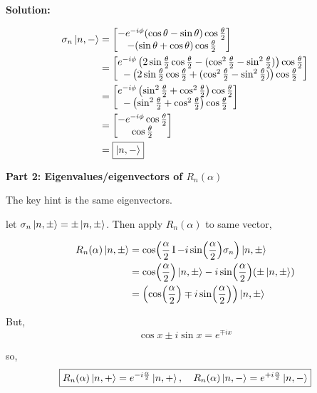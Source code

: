 \documentclass[11pt]{article}
\newenvironment{solution}
{\par\noindent\textbf{Solution:}\par}
{\vspace{1em}}
\begin{document}
\begin{solution}
\[\begin{aligned}
\sigma_n\ket{n,-} &= \begin{bmatrix}-e^{-i\phi}(\cos{\theta} - \sin{\theta})\cos{\frac{\theta}{2}} \\ -(\sin{\theta} + \cos{\theta})\cos{\frac{\theta}{2}}\end{bmatrix} \\
&= \begin{bmatrix}e^{-i\phi}\left(2\sin{\frac{\theta}{2}}\cos{\frac{\theta}{2}} - (\cos^2{\frac{\theta}{2}} - \sin^2{\frac{\theta}{2}})\right)\cos{\frac{\theta}{2}} \\ -\left(2\sin{\frac{\theta}{2}}\cos{\frac{\theta}{2}} + (\cos^2{\frac{\theta}{2}} - \sin^2{\frac{\theta}{2}})\right)\cos{\frac{\theta}{2}}\end{bmatrix} \\
&= \begin{bmatrix}e^{-i\phi}\left(\sin^2{\frac{\theta}{2}} + \cos^2{\frac{\theta}{2}}\right)\cos{\frac{\theta}{2}} \\ -\left(\sin^2{\frac{\theta}{2}} + \cos^2{\frac{\theta}{2}}\right)\cos{\frac{\theta}{2}}\end{bmatrix} \\
&= \begin{bmatrix}-e^{-i\phi}\cos{\frac{\theta}{2}} \\ \cos{\frac{\theta}{2}}\end{bmatrix} \\
&= \boxed{\ket{n,-}}
\end{aligned}\]

\textbf{Part 2: Eigenvalues/eigenvectors of $R_n(\alpha)$}

The key hint is the same eigenvectors.

let $\sigma_n\ket{n,\pm} = \pm\ket{n,\pm}$. Then apply $R_n(\alpha)$ to same vector,

\[\begin{aligned}
R_n(\alpha)\ket{n,\pm} &= \cos(\frac{\alpha}{2}\operatorname{I} - i \sin(\frac{\alpha}{2})\sigma_n)\ket{n,\pm} \\
&= \cos(\frac{\alpha}{2})\ket{n,\pm} - i \sin(\frac{\alpha}{2})(\pm\ket{n,\pm}) \\
&= \left(\cos(\frac{\alpha}{2}) \mp i \sin(\frac{\alpha}{2})\right)\ket{n,\pm}
\end{aligned}\]

But, \[\cos{x} \pm i \sin{x} = e^{\mp ix}\]

so, \[\boxed{R_n(\alpha)\ket{n,+} = e^{-i\frac{\alpha}{2}}\ket{n,+}, \quad R_n(\alpha)\ket{n,-} = e^{+i\frac{\alpha}{2}}\ket{n,-}}\]


\end{solution}
\end{document}
